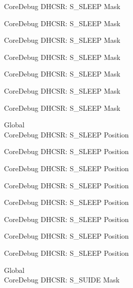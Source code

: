 \begin{DoxyRefList}
\label{deprecated__deprecated000116}%
%
Core\+Debug DHCSR\+: S\+\_\+\+SLEEP Mask 

\label{deprecated__deprecated000170}%
%
Core\+Debug DHCSR\+: S\+\_\+\+SLEEP Mask 

\label{deprecated__deprecated000255}%
%
Core\+Debug DHCSR\+: S\+\_\+\+SLEEP Mask 

\label{deprecated__deprecated000312}%
%
Core\+Debug DHCSR\+: S\+\_\+\+SLEEP Mask 

\label{deprecated__deprecated000388}%
%
Core\+Debug DHCSR\+: S\+\_\+\+SLEEP Mask 

\label{deprecated__deprecated000475}%
%
Core\+Debug DHCSR\+: S\+\_\+\+SLEEP Mask 

\label{deprecated__deprecated000577}%
%
Core\+Debug DHCSR\+: S\+\_\+\+SLEEP Mask  
\item[Global \doxylink{group___c_m_s_i_s___core_debug_ga349ccea33accc705595624c2d334fbcb}{Core\+Debug\+\_\+\+DHCSR\+\_\+\+S\+\_\+\+SLEEP\+\_\+\+Pos} ]\hfill \\
\label{deprecated__deprecated000023}%
%
Core\+Debug DHCSR\+: S\+\_\+\+SLEEP Position 

\label{deprecated__deprecated000115}%
%
Core\+Debug DHCSR\+: S\+\_\+\+SLEEP Position 

\label{deprecated__deprecated000169}%
%
Core\+Debug DHCSR\+: S\+\_\+\+SLEEP Position 

\label{deprecated__deprecated000254}%
%
Core\+Debug DHCSR\+: S\+\_\+\+SLEEP Position 

\label{deprecated__deprecated000311}%
%
Core\+Debug DHCSR\+: S\+\_\+\+SLEEP Position 

\label{deprecated__deprecated000387}%
%
Core\+Debug DHCSR\+: S\+\_\+\+SLEEP Position 

\label{deprecated__deprecated000474}%
%
Core\+Debug DHCSR\+: S\+\_\+\+SLEEP Position 

\label{deprecated__deprecated000576}%
%
Core\+Debug DHCSR\+: S\+\_\+\+SLEEP Position  
\item[Global \doxylink{group___c_m_s_i_s___s_c_b_gad37656791dbb216ffb194995f28c412c}{Core\+Debug\+\_\+\+DHCSR\+\_\+\+S\+\_\+\+SUIDE\+\_\+\+Msk} ]\hfill \\
\label{deprecated__deprecated000016}%
%
Core\+Debug DHCSR\+: S\+\_\+\+SUIDE Mask 


\end{DoxyRefList}
